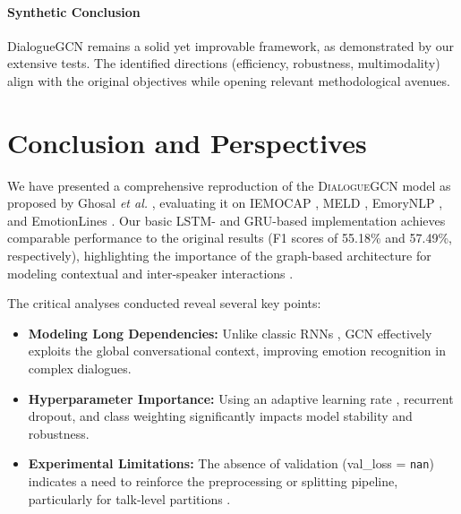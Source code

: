 \documentclass[a4paper,11pt]{article}
\begin{document}
\paragraph{Synthetic Conclusion}
DialogueGCN remains a solid yet improvable framework, as demonstrated by our extensive tests. The identified directions (efficiency, robustness, multimodality) align with the original objectives while opening relevant methodological avenues.

\section{Conclusion and Perspectives}
\label{sec:conclusion}

We have presented a comprehensive reproduction of the \textsc{DialogueGCN} model as proposed by Ghosal \emph{et al.} \cite{ghosal2019dialoguegcn}, evaluating it on IEMOCAP \cite{Busso2008IEMOCAP}, MELD \cite{poria2019meld}, EmoryNLP \cite{poria2017context}, and EmotionLines \cite{zahiri2018emotion}.  
Our basic LSTM- and GRU-based implementation achieves comparable performance to the original results (F1 scores of 55.18\% and 57.49\%, respectively), highlighting the importance of the graph-based architecture for modeling contextual and inter-speaker interactions \cite{kipf2016semi}.  

The critical analyses conducted reveal several key points:
\begin{itemize}
  \item \textbf{Modeling Long Dependencies:} Unlike classic RNNs \cite{majumder2019dialoguernn}, GCN effectively exploits the global conversational context, improving emotion recognition in complex dialogues.  
  \item \textbf{Hyperparameter Importance:} Using an adaptive learning rate \cite{chollet2015keras}, recurrent dropout, and class weighting significantly impacts model stability and robustness.  
  \item \textbf{Experimental Limitations:} The absence of validation (val\_loss = \texttt{nan}) indicates a need to reinforce the preprocessing or splitting pipeline, particularly for talk-level partitions \cite{li2020graph}.  
\end{itemize}
\end{document}
